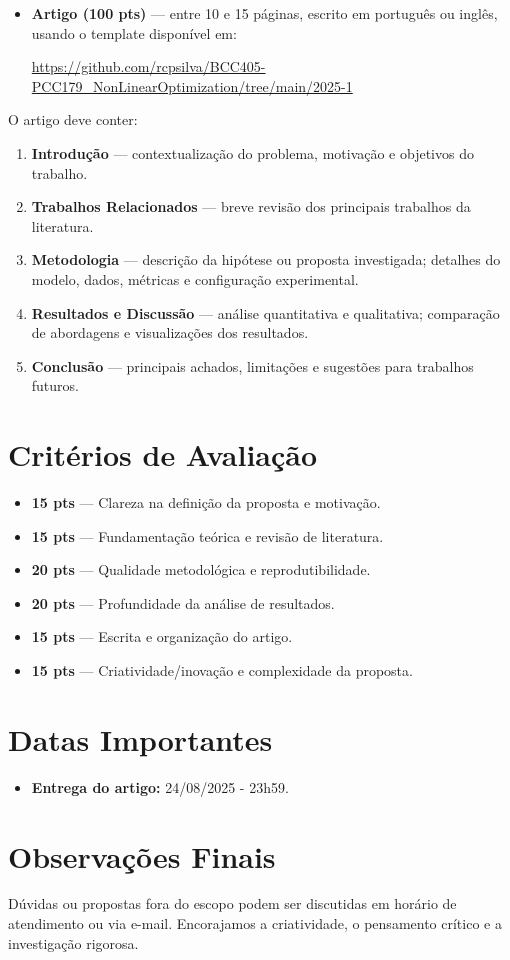 \documentclass[12pt]{article}
\begin{document}
\begin{itemize}[nosep]
  \item \textbf{Artigo (100 pts)} — entre 10 e 15 páginas, escrito em português ou inglês, usando o template disponível em:
    \begin{center}
      \url{https://github.com/rcpsilva/BCC405-PCC179_NonLinearOptimization/tree/main/2025-1}
    \end{center}
\end{itemize}

O artigo deve conter:

\begin{enumerate}[label=\textbf{\arabic*.}, nosep]
  \item \textbf{Introdução} — contextualização do problema, motivação e objetivos do trabalho.
  \item \textbf{Trabalhos Relacionados} — breve revisão dos principais trabalhos da literatura.
  \item \textbf{Metodologia} — descrição da hipótese ou proposta investigada; detalhes do modelo, dados, métricas e configuração experimental.
  \item \textbf{Resultados e Discussão} — análise quantitativa e qualitativa; comparação de abordagens e visualizações dos resultados.
  \item \textbf{Conclusão} — principais achados, limitações e sugestões para trabalhos futuros.
\end{enumerate}

\section*{Critérios de Avaliação}

\begin{itemize}[nosep]
  \item \textbf{15 pts} — Clareza na definição da proposta e motivação.
  \item \textbf{15 pts} — Fundamentação teórica e revisão de literatura.
  \item \textbf{20 pts} — Qualidade metodológica e reprodutibilidade.
  \item \textbf{20 pts} — Profundidade da análise de resultados.
  \item \textbf{15 pts} — Escrita e organização do artigo.
  \item \textbf{15 pts} — Criatividade/inovação e complexidade da proposta.
\end{itemize}

\section*{Datas Importantes}

\begin{itemize}[nosep]
  \item \textbf{Entrega do artigo:} 24/08/2025 - 23h59.
\end{itemize}

\section*{Observações Finais}

Dúvidas ou propostas fora do escopo podem ser discutidas em horário de atendimento ou via e-mail. Encorajamos a criatividade, o pensamento crítico e a investigação rigorosa.
\end{document}
